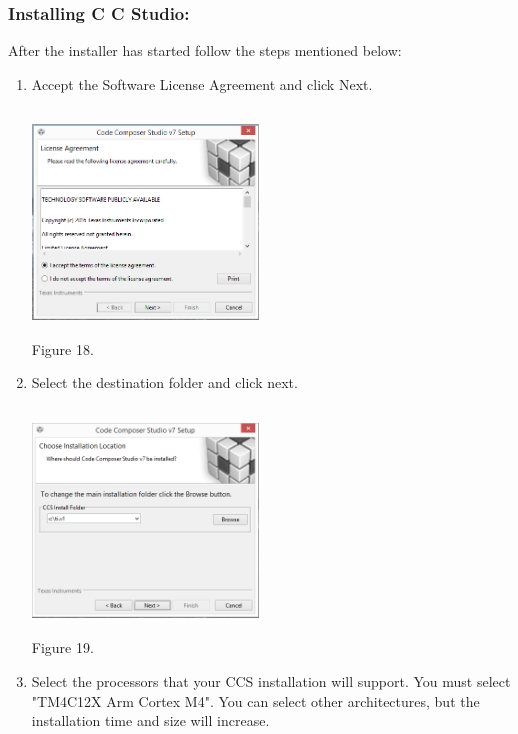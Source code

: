 \documentclass[a4paper,10pt,oneside]{article}
\begin{document}
			\subsubsection{\textbf{Installing C C Studio:}}
				{After the installer has started follow the steps mentioned below:\\
				\begin{enumerate}
					\item Accept the Software License Agreement and click Next.\\
							\begin{center}
							\includegraphics[width=6cm, height=6cm]{Images/CCSInstall1}\\
						Figure 18.
						\end{center}
					\item Select the destination folder and click next.\\
							\begin{center}
							\includegraphics[width=6cm, height=6cm]{Images/CCSInstall2}\\
							Figure 19.	
					\end{center}
					\item Select the processors that your CCS installation will support. You
						must select "TM4C12X Arm Cortex M4". You can select other architectures, but the installation time and size will increase.\\

\end{enumerate}}
\end{document}
